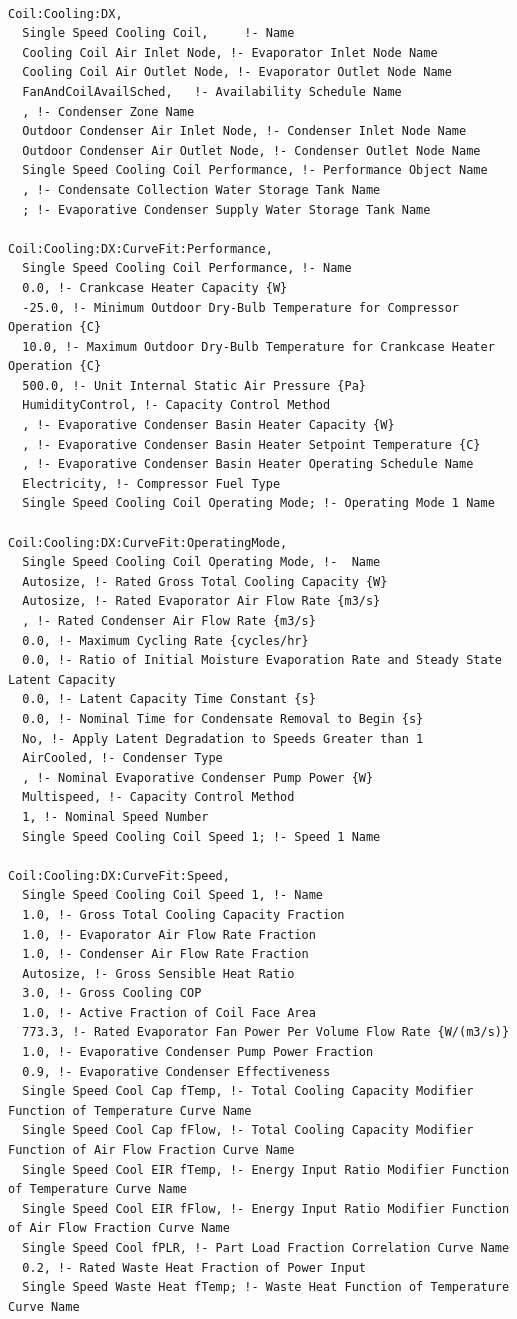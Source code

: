 \begin{lstlisting}

Coil:Cooling:DX,
  Single Speed Cooling Coil,     !- Name
  Cooling Coil Air Inlet Node, !- Evaporator Inlet Node Name
  Cooling Coil Air Outlet Node, !- Evaporator Outlet Node Name
  FanAndCoilAvailSched,   !- Availability Schedule Name
  , !- Condenser Zone Name
  Outdoor Condenser Air Inlet Node, !- Condenser Inlet Node Name
  Outdoor Condenser Air Outlet Node, !- Condenser Outlet Node Name
  Single Speed Cooling Coil Performance, !- Performance Object Name
  , !- Condensate Collection Water Storage Tank Name
  ; !- Evaporative Condenser Supply Water Storage Tank Name

Coil:Cooling:DX:CurveFit:Performance,
  Single Speed Cooling Coil Performance, !- Name
  0.0, !- Crankcase Heater Capacity {W}
  -25.0, !- Minimum Outdoor Dry-Bulb Temperature for Compressor Operation {C}
  10.0, !- Maximum Outdoor Dry-Bulb Temperature for Crankcase Heater Operation {C}
  500.0, !- Unit Internal Static Air Pressure {Pa}
  HumidityControl, !- Capacity Control Method
  , !- Evaporative Condenser Basin Heater Capacity {W}
  , !- Evaporative Condenser Basin Heater Setpoint Temperature {C}
  , !- Evaporative Condenser Basin Heater Operating Schedule Name
  Electricity, !- Compressor Fuel Type
  Single Speed Cooling Coil Operating Mode; !- Operating Mode 1 Name

Coil:Cooling:DX:CurveFit:OperatingMode,
  Single Speed Cooling Coil Operating Mode, !-  Name
  Autosize, !- Rated Gross Total Cooling Capacity {W}
  Autosize, !- Rated Evaporator Air Flow Rate {m3/s}
  , !- Rated Condenser Air Flow Rate {m3/s}
  0.0, !- Maximum Cycling Rate {cycles/hr}
  0.0, !- Ratio of Initial Moisture Evaporation Rate and Steady State Latent Capacity
  0.0, !- Latent Capacity Time Constant {s}
  0.0, !- Nominal Time for Condensate Removal to Begin {s}
  No, !- Apply Latent Degradation to Speeds Greater than 1
  AirCooled, !- Condenser Type
  , !- Nominal Evaporative Condenser Pump Power {W}
  Multispeed, !- Capacity Control Method
  1, !- Nominal Speed Number
  Single Speed Cooling Coil Speed 1; !- Speed 1 Name

Coil:Cooling:DX:CurveFit:Speed,
  Single Speed Cooling Coil Speed 1, !- Name
  1.0, !- Gross Total Cooling Capacity Fraction
  1.0, !- Evaporator Air Flow Rate Fraction
  1.0, !- Condenser Air Flow Rate Fraction
  Autosize, !- Gross Sensible Heat Ratio
  3.0, !- Gross Cooling COP
  1.0, !- Active Fraction of Coil Face Area
  773.3, !- Rated Evaporator Fan Power Per Volume Flow Rate {W/(m3/s)}
  1.0, !- Evaporative Condenser Pump Power Fraction
  0.9, !- Evaporative Condenser Effectiveness
  Single Speed Cool Cap fTemp, !- Total Cooling Capacity Modifier Function of Temperature Curve Name
  Single Speed Cool Cap fFlow, !- Total Cooling Capacity Modifier Function of Air Flow Fraction Curve Name
  Single Speed Cool EIR fTemp, !- Energy Input Ratio Modifier Function of Temperature Curve Name
  Single Speed Cool EIR fFlow, !- Energy Input Ratio Modifier Function of Air Flow Fraction Curve Name
  Single Speed Cool fPLR, !- Part Load Fraction Correlation Curve Name
  0.2, !- Rated Waste Heat Fraction of Power Input
  Single Speed Waste Heat fTemp; !- Waste Heat Function of Temperature Curve Name


\end{lstlisting}
